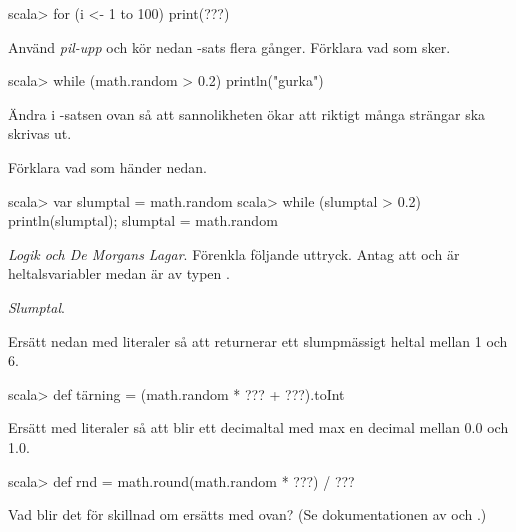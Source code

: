 {{{{\begin{REPLnonum}
scala> for (i <- 1 to 100) print(???)
\end{REPLnonum}


\Subtask Använd \textit{pil-upp} och kör nedan -sats flera gånger. Förklara vad som sker.

\begin{REPLnonum}
scala> while (math.random > 0.2) println("gurka")
\end{REPLnonum}

\Subtask Ändra i -satsen ovan så att sannolikheten ökar att riktigt många strängar ska skrivas ut.

\Subtask Förklara vad som händer nedan.
\begin{REPL}
scala> var slumptal = math.random
scala> while (slumptal > 0.2) { println(slumptal); slumptal = math.random }
\end{REPL}

\Task\Pen \textit{Logik och De Morgans Lagar}. Förenkla följande uttryck. Antag att  och  är heltalsvariabler medan  är av typen .

\Subtask {}

\Subtask {}

\Subtask {}

\Subtask {}

\Subtask {}

\Subtask {}

\Subtask {}


\ExtraTasks

\Task \textit{Slumptal}.

\Subtask Ersätt  nedan med literaler så att  returnerar ett slumpmässigt heltal mellan 1 och 6.
\begin{REPLnonum}
scala> def tärning = (math.random * ??? + ???).toInt 
\end{REPLnonum}

\Subtask Ersätt  med literaler så att  blir ett decimaltal med max en decimal mellan 0.0 och 1.0.
\begin{REPLnonum}
scala> def rnd = math.round(math.random * ???) / ??? 
\end{REPLnonum}

\Subtask Vad blir det för skillnad om  ersätts med  ovan? (Se dokumentationen av  och .)

}}}}

